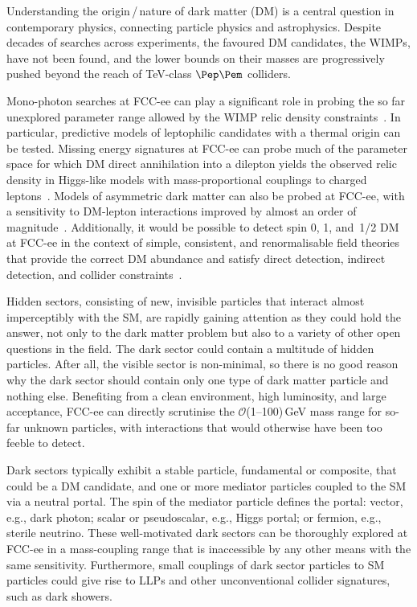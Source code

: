 Understanding the origin\,/\,nature of dark matter (DM) is a central question in contemporary physics, 
connecting particle physics and astrophysics. 
Despite decades of searches across experiments, the favoured DM candidates, the WIMPs, have not been found, 
and the lower bounds on their masses are progressively pushed beyond the reach of TeV-class $\epem$ colliders.

Mono-photon searches at FCC-ee can play a significant role in probing the so far unexplored parameter range 
allowed by the WIMP relic density constraints~\cite{Horigome:2021qof}.  
In particular, predictive models of leptophilic candidates with a thermal origin can be tested.  
Missing energy signatures at FCC-ee can probe much of the parameter space 
for which DM direct annihilation into a dilepton yields the observed relic density 
in Higgs-like models with mass-proportional couplings to charged leptons~\cite{Cesarotti:2024rbh}. 
Models of asymmetric dark matter can also be probed at FCC-ee, 
with a sensitivity to DM-lepton interactions improved by almost an order of magnitude~\cite{Roy:2024ear}. 
Additionally, it would be possible to detect spin 0, 1, and~1/2 DM at FCC-ee 
in the context of simple, consistent, and renormalisable field theories 
that provide the correct DM abundance and satisfy direct detection, indirect detection, 
and collider constraints~\cite{Grzadkowski:2020frj}. 

Hidden sectors, consisting of new, invisible particles that interact almost imperceptibly with the SM, 
are rapidly gaining attention as they could hold the answer, 
not only to the dark matter problem but also to a variety of other open questions in the field. 
The dark sector could contain a multitude of hidden particles. 
After all, the visible sector is non-minimal, 
so there is no good reason why the dark sector should contain only one type of dark matter particle and nothing else. 
Benefiting from a clean environment, high luminosity, and large acceptance, 
FCC-ee can directly scrutinise the $\mathcal{O}$(1--100)\,GeV mass range for 
so-far unknown particles, with interactions that would otherwise have been too feeble to detect. 

Dark sectors typically exhibit a stable particle, fundamental or composite, that could be a DM candidate, 
and one or more mediator particles coupled to the SM via a neutral portal. 
The spin of the mediator particle defines the portal: 
vector, e.g., dark photon; 
scalar or pseudoscalar, e.g., Higgs portal; 
or fermion, e.g., sterile neutrino. 
These well-motivated dark sectors can be thoroughly explored at FCC-ee 
in a mass-coupling range that is inaccessible by any other means with the same sensitivity. 
Furthermore, small couplings of dark sector particles to SM particles could give rise to LLPs 
and other unconventional collider signatures, such as dark showers.  

